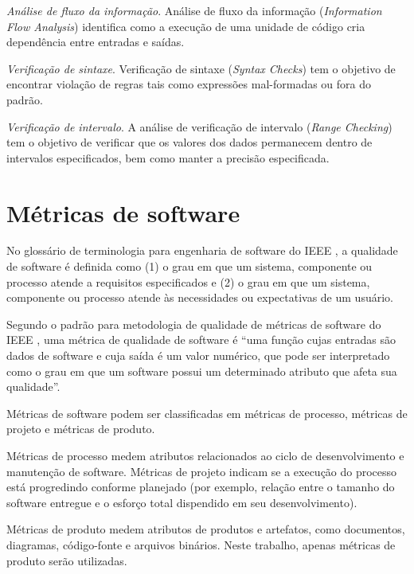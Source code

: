 \begin{description}
  \item \textit{Análise de fluxo da informação}.
    Análise de fluxo da informação ({\it Information Flow Analysis}) identifica
    como a execução de uma unidade de código cria dependência entre entradas e
    saídas.

  \item \textit{Verificação de sintaxe}.
    Verificação de sintaxe ({\it Syntax Checks}) tem o objetivo de encontrar
    violação de regras tais como expressões mal-formadas ou fora do padrão.

  \item \textit{Verificação de intervalo}.
    A análise de verificação de intervalo ({\it Range Checking}) tem o objetivo
    de verificar que os valores dos dados permanecem dentro de intervalos
    especificados, bem como manter a precisão especificada.

\end{description}

\section{Métricas de software} \label{metricas}

No glossário de terminologia para engenharia de software do IEEE
\cite{ieee1990ieee}, a qualidade de software é definida como (1) o grau em que
um sistema, componente ou processo atende a requisitos especificados e (2) o
grau em que um sistema, componente ou processo atende às necessidades ou
expectativas de um usuário. 

Segundo o padrão para metodologia de qualidade de métricas de software do IEEE
\cite{software1998ieee}, uma métrica de qualidade de software é ``uma função
cujas entradas são dados de software e cuja saída é um valor numérico, que
pode ser interpretado como o grau em que um software possui um determinado
atributo que afeta sua qualidade''.

Métricas de software podem ser classificadas em métricas de processo, métricas
de projeto e métricas de produto.

Métricas de processo medem atributos relacionados ao ciclo de desenvolvimento
e manutenção de software. Métricas de projeto indicam se a execução do
processo está progredindo conforme planejado (por exemplo, relação entre o
tamanho do software entregue e o esforço total dispendido em seu
desenvolvimento).

Métricas de produto medem atributos de produtos e artefatos, como documentos,
diagramas, código-fonte e arquivos binários. Neste trabalho,
apenas métricas de produto serão utilizadas.

